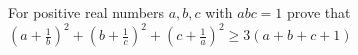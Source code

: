 For positive real numbers $a,b,c$ with $abc=1$ prove that $\left(a+\frac{1}{b}\right)^{2}+\left(b+\frac{1}{c}\right)^{2}+\left(c+\frac{1}{a}\right)^{2}\geq 3(a+b+c+1)$